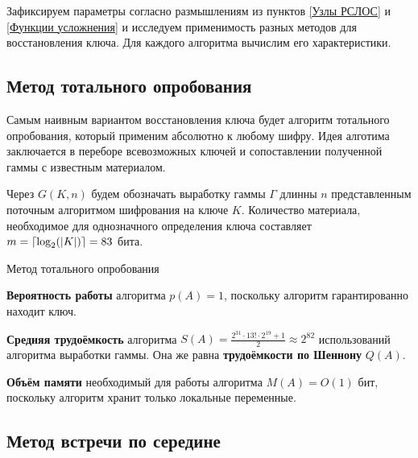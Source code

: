 \documentclass[a4paper,12pt]{article}
\DeclarePairedDelimiter{\ceil}{\lceil}{\rceil}
\theoremstyle{definition}
\begin{document}
	Зафиксируем параметры согласно размышлениям из пунктов \ref{Узлы РСЛОС} и \ref{Функции усложнения} и исследуем применимость разных методов для восстановления ключа. Для каждого алгоритма вычислим его характеристики.
	
	
	\subsection{Метод тотального опробования}
	
	Самым наивным вариантом восстановления ключа будет алгоритм тотального опробования, который применим абсолютно к любому шифру. Идея алготима заключается в переборе всевозможных ключей и сопоставлении полученной гаммы с известным материалом.
	
	Через $G(K, n)$ будем обозначать выработку гаммы $\Gamma$ длинны $n$ представленным поточным алгоритмом шифрования на ключе $K$. Количество материала, необходимое для однозначного определения ключа составляет $m=\ceil{\log_2(|K|)}=83$ бита.

	\begin{algorithm}[H]
		
		\caption{Метод тотального опробования}
		\label{alg:Total}
		\SetAlgoNoEnd
		
		
	\end{algorithm}	
	
	
	\textbf{Вероятность работы} алгоритма $p(A)=1$, поскольку алгоритм гарантированно находит ключ. 
	
	\textbf{Средняя трудоёмкость} алгоритма $S(A)=\frac{2^{31} \cdot 13! \cdot 2^{19} + 1}{2} \approx 2^{82} $ использований алгоритма выработки гаммы. Она же равна \textbf{трудоёмкости по Шеннону} $Q(A)$.
	
	\textbf{Объём памяти} необходимый для работы алгоритма $M(A) = O(1)$ бит, поскольку алгоритм хранит только локальные переменные.
	
	\subsection{Метод встречи по середине}
	
\end{document}

